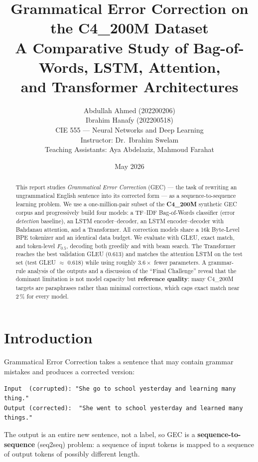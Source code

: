 \documentclass[11pt,a4paper]{article}
\title{\textbf{Grammatical Error Correction on the C4\_200M Dataset}\\[4pt]
\large A Comparative Study of Bag-of-Words, LSTM, Attention,\\
and Transformer Architectures}
\author{
  Abdullah Ahmed \quad (202200206)\\
  Ibrahim Hanafy \quad (202200518)\\[6pt]
  \normalsize CIE 555 --- Neural Networks and Deep Learning\\
  \normalsize Instructor: Dr.\ Ibrahim Swelam\\
  \normalsize Teaching Assistants: Aya Abdelaziz, Mahmoud Farahat
}
\date{May 2026}
\begin{document}
\maketitle

\begin{abstract}
\noindent
This report studies \emph{Grammatical Error Correction} (GEC) --- the task of
rewriting an ungrammatical English sentence into its corrected form --- as a
sequence-to-sequence learning problem. We use a one-million-pair subset of the
\textbf{C4\_200M} synthetic GEC corpus and progressively build four models: a
TF--IDF Bag-of-Words classifier (error \emph{detection} baseline), an LSTM
encoder--decoder, an LSTM encoder--decoder with Bahdanau attention, and a
Transformer. All correction models share a 16k Byte-Level BPE tokenizer and an
identical data budget. We evaluate with GLEU, exact match, and token-level
$F_{0.5}$, decoding both greedily and with beam search. The Transformer reaches
the best validation GLEU (0.613) and matches the attention LSTM on the test set
(test GLEU $\approx$ 0.618) while using roughly $3.6\times$ fewer parameters. A
grammar-rule analysis of the outputs and a discussion of the ``Final Challenge''
reveal that the dominant limitation is not model capacity but \textbf{reference
quality}: many C4\_200M targets are paraphrases rather than minimal corrections,
which caps exact match near 2\,\% for every model.
\end{abstract}

\tableofcontents
\newpage

\section{Introduction}
Grammatical Error Correction takes a sentence that may contain grammar mistakes
and produces a corrected version:

\begin{lstlisting}
Input  (corrupted): "She go to school yesterday and learning many thing."
Output (corrected):  "She went to school yesterday and learned many things."
\end{lstlisting}

The output is an entire new sentence, not a label, so GEC is a
\textbf{sequence-to-sequence} (seq2seq) problem: a sequence of input tokens is
mapped to a sequence of output tokens of possibly different length.
\end{document}
